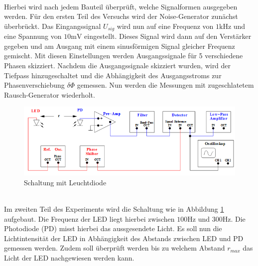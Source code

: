 \\
Hierbei wird nach jedem Bauteil überprüft, welche Signalformen ausgegeben werden.
Für den ersten Teil des Versuchs wird der Noise-Generator zunächst überbrückt.
Das Eingangssignal $U_{sig}$ wird nun auf eine Frequenz von $1\si{\kilo\hertz}$
und eine Spannung von $10\si{\milli\volt}$ eingestellt. Dieses Signal wird dann
auf den Verstärker gegeben und am Ausgang mit einem sinusförmigen Signal gleicher
Frequenz gemischt. Mit diesen Einstellungen werden Ausgangssignale für 5 verschiedene
Phasen skizziert.
Nachdem die Ausgangssignale skizziert wurden, wird der Tiefpass hinzugeschaltet
und die Abhängigkeit des Ausgangsstroms zur Phasenverschiebung
$\delta\Phi$ gemessen.
Nun werden die Messungen mit zugeschlatetem Rausch-Generator wiederholt.
\\
\begin{figure}
  \centering
  \includegraphics[width=\textwidth]{Bilder/LEDSchaltung.jpg}
  \caption{Schaltung mit Leuchtdiode \cite{303}}
  \label{fig:led}
\end{figure}  %
\\
Im zweiten Teil des Experiments wird die Schaltung wie in Abbildung \ref{fig:led}
aufgebaut. Die Frequenz der LED liegt hierbei zwischen $100 \si{\hertz}$ und
$300 \si{\hertz}$.
Die Photodiode (PD) misst hierbei das aussgesendete Licht.
Es soll nun die Lichtintensität der LED in Abhängigkeit des Abstands
zwischen LED und PD gemessen werden. Zudem soll überprüft werden bis zu welchem
Abstand $r_{max}$ das Licht der LED nachgewiesen werden kann.
\newpage
